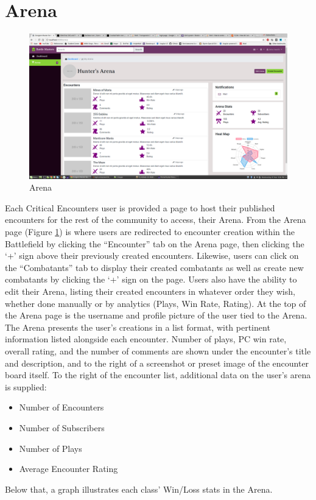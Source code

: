 \documentclass[12pt,a4paper]{report}
\begin{document}
	\section{Arena}
	\begin{figure}[H]
		\centering
		\includegraphics[scale=.20]{arena}
		\caption{Arena}
		\label{fig: Arena}
	\end{figure}
	Each Critical Encounters user is provided a page to host their published encounters for the rest of the community to access, their Arena. From the Arena page (Figure \ref{fig: Arena}) is where users are redirected to encounter creation within the Battlefield by clicking the ``Encounter'' tab on the Arena page, then clicking the `+' sign above their previously created encounters. Likewise, users can click on the ``Combatants'' tab to display their created combatants as well as create new combatants by clicking the `+' sign on the page. Users also have the ability to edit their Arena, listing their created encounters in whatever order they wish, whether done manually or by analytics (Plays, Win Rate, Rating). At the top of the Arena page is the username and profile picture of the user tied to the Arena. The Arena presents the user's creations in a list format, with pertinent information listed alongside each encounter. Number of plays, PC win rate, overall rating, and the number of comments are shown under the encounter's title and description, and to the right of a screenshot or preset image of the encounter board itself. To the right of the encounter list, additional data on the user's arena is supplied: 
	\begin{multicols}{2}
		\begin{itemize}
			\item Number of Encounters
			\item Number of Subscribers
			\item Number of Plays
			\item Average Encounter Rating
		\end{itemize}
	\end{multicols}
	\noindent Below that, a graph illustrates each class' Win/Loss stats in the Arena.
	\newpage
\end{document}
